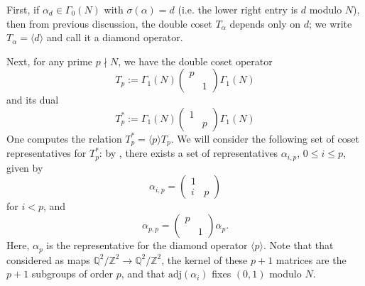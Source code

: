 \documentclass[10pt]{amsart}
\theoremstyle{definition}
\newcommand{\Z}{\mathbb{Z}}
\newcommand{\Q}{\mathbb{Q}}
\numberwithin{equation}{section}
\begin{document}
    First, if $\alpha_d\in \Gamma_0(N)$ with $\sigma(\alpha)=d$ (i.e. the lower right entry is $d$ modulo $N$), then from previous discussion, the double coset $T_\alpha$ depends only on $d$; we write $T_\alpha=\langle d\rangle$ and call it a diamond operator.

    Next, for any prime $p \nmid N$, we have the double coset operator 
    \[
    T_p:=\Gamma_1(N) \begin{pmatrix} p & \\ & 1 \end{pmatrix} \Gamma_1(N)
    \]
    and its dual
    \[
    T_p^*:=\Gamma_1(N) \begin{pmatrix} 1 & \\ & p \end{pmatrix} \Gamma_1(N)
    \]
    One computes the relation $T_p^* = \langle p \rangle T_{p}$. We will consider the following set of coset representatives for $T_p^*$: by \cite[Theorem 4.3.7]{SV}, there exists a set of representatives $\alpha_{i,p}$, $0\le i \le p$, given by 
    \[
    \alpha_{i,p} = \begin{pmatrix}1 & \\ i & p \end{pmatrix}
    \]
    for $i<p$, and 
    \[
    \alpha_{p,p} = \begin{pmatrix}p & \\  & 1 \end{pmatrix} \alpha_p.
    \]
    Here, $\alpha_{p}$ is the representative for the diamond operator $\langle p\rangle$. Note that that considered as maps $\Q^2/\Z^2 \to \Q^2/\Z^2$, the kernel of these $p+1$ matrices are the $p+1$ subgroups of order $p$, and that $\text{adj}(\alpha_i)$ fixes $(0,1)$ modulo $N$.
    
\end{document}
